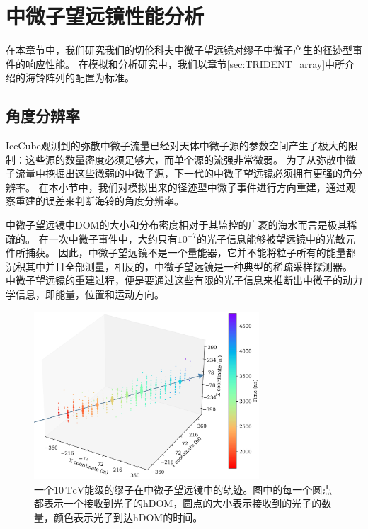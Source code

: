 \chapter{中微子望远镜性能分析}
\label{chap:telescope_performance}

在本章节中，我们研究我们的切伦科夫中微子望远镜对缪子中微子产生的径迹型事件的响应性能。
在模拟和分析研究中，我们以章节\ref{sec:TRIDENT_array}中所介绍的海铃阵列的配置为标准。

\section{角度分辨率}
\label{sec:angular_resolution}

IceCube观测到的弥散中微子流量已经对天体中微子源的参数空间产生了极大的限制：这些源的数量密度必须足够大，而单个源的流强非常微弱。
为了从弥散中微子流量中挖掘出这些微弱的中微子源，下一代的中微子望远镜必须拥有更强的角分辨率\cite{Fang_resolve_flux:2016}。
在本小节中，我们对模拟出来的径迹型中微子事件进行方向重建，通过观察重建的误差来判断海铃的角度分辨率。

中微子望远镜中DOM的大小和分布密度相对于其监控的广袤的海水而言是极其稀疏的。
在一次中微子事件中，大约只有$10^{-7}$的光子信息能够被望远镜中的光敏元件所捕获。
因此，中微子望远镜不是一个量能器，它并不能将粒子所有的能量都沉积其中并且全部测量，相反的，中微子望远镜是一种典型的稀疏采样探测器。
中微子望远镜的重建过程，便是要通过这些有限的光子信息来推断出中微子的动力学信息，即能量，位置和运动方向。

\begin{figure}[!htb]%
    \centering
    \includegraphics[width=0.75\textwidth]{img/track-like_event.jpg}
    \caption{一个$10\,\mathrm{TeV}$能级的缪子在中微子望远镜中的轨迹。图中的每一个圆点都表示一个接收到光子的hDOM，圆点的大小表示接收到的光子的数量，颜色表示光子到达hDOM的时间。}
    \label{fig:track-like_event}
\end{figure}

